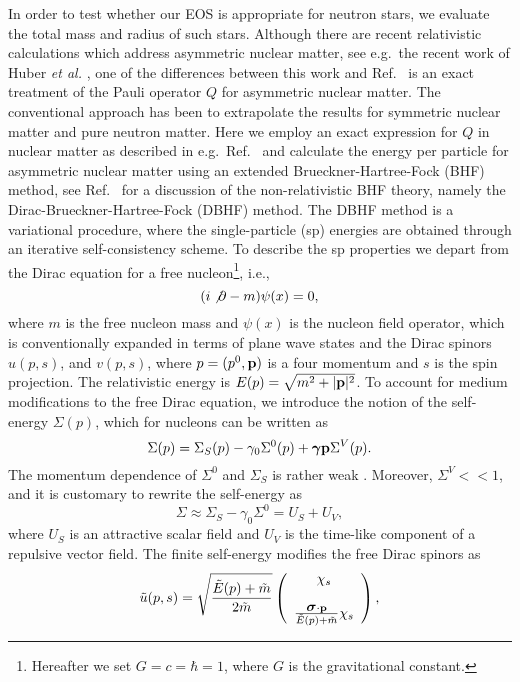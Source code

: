 In order to test whether our EOS is appropriate
for neutron stars, we evaluate the total mass and radius of such 
stars. Although there are recent relativistic calculations which 
address asymmetric nuclear matter,
see e.g.\ the recent work of Huber {\em et al.}
\cite{hww93}, one of the  differences
between this work and Ref.\ \cite{hww93}
is an exact treatment of the Pauli operator $Q$ for asymmetric
nuclear matter. The conventional approach has been to extrapolate
the results for symmetric nuclear matter and pure neutron matter.
Here we employ an exact expression for $Q$
in nuclear matter as described in e.g.\ Ref.\ \cite{swk92}
and calculate the energy per particle for asymmetric nuclear
matter using an extended Brueckner-Hartree-Fock (BHF) method,
see Ref.\ \cite{ms89} for a discussion of the non-relativistic
BHF theory,
namely the Dirac-Brueckner-Hartree-Fock (DBHF) method.
The DBHF method is a variational procedure, where the single-particle (sp)
energies are obtained through an iterative self-consistency scheme.
To describe the sp properties we depart from the Dirac equation for
a free nucleon\footnote{Hereafter we set $G=c=\hbar=1$, where
$G$ is the gravitational constant.}, i.e.,
\begin{equation}
     (i\not \partial -m )\psi (x)=0,
\end{equation}
where $m$ is the free nucleon mass and $\psi (x)$
is  the nucleon field operator,
which is conventionally expanded in terms of plane wave states
and the Dirac spinors $u(p,s)$, and $ v(p,s)$, where
 $p=(p^0 ,{\bf p})$ is
a four momentum and  $s$ is the spin projection.
The relativistic energy is $E(p) =\sqrt{m^2 +|{\bf p}|^2}$.
To account for medium modifications to the free Dirac equation,
we introduce the notion of the self-energy $\Sigma (p)$, which 
for nucleons can be written as
\begin{equation}
       \Sigma(p) =
       \Sigma_S(p) -\gamma_0 \Sigma^0(p)
       +\mbox{\boldmath $\gamma$}{\bf p}\Sigma^V(p).
\end{equation}
The momentum dependence of $\Sigma^0$
and $\Sigma_S$ is rather weak \cite{bm90,sw86}.
Moreover, $\Sigma^V << 1$, and it is customary to rewrite the self-energy
as
\begin{equation}
     \Sigma \approx \Sigma_S -\gamma_0 \Sigma^0 = U_S + U_V,
\end{equation}
where $U_S$ is an attractive
scalar field and $U_V$ is the time-like component
of a repulsive vector field.
The finite self-energy modifies the
free Dirac spinors as
\begin{equation}
   \tilde{u}(p,s)=\sqrt{\frac{\tilde{E}(p)+\tilde{m}}{2\tilde{m}}}
	  \left(\begin{array}{c} \chi_s\\ \\
	  \frac{\mbox{\boldmath $\sigma$}\cdot{\bf p}}
          {\tilde{E}(p)+\tilde{m}}\chi_s
	  \end{array}\right),
\end{equation}
